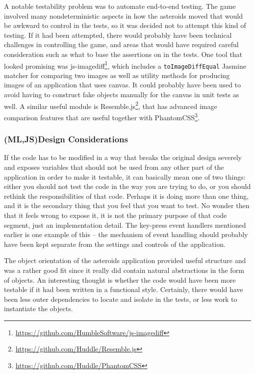 \documentclass[11pt]{article}
\begin{document}
A notable testability problem was to automate end-to-end testing. The game involved many nondeterministic aspects in how the asteroids moved that would be awkward to control in the tests, so it was decided not to attempt this kind of testing. If it had been attempted, there would probably have been technical challenges in controlling the game, and areas that would have required careful consideration such as what to base the assertions on in the tests. One tool that looked promising was js-imagediff\footnote{\url{https://github.com/HumbleSoftware/js-imagediff}}, which includes a \texttt{toImageDiffEqual} Jasmine matcher for comparing two images as well as utility methods for producing images of an application that uses canvas. It could probably have been used to avoid having to construct fake objects manually for the canvas in unit tests as well. A similar useful module is Resemble.js\footnote{\url{https://github.com/Huddle/Resemble.js}}, that has advanced image comparison features that are useful together with PhantomCSS\footnote{\url{https://github.com/Huddle/PhantomCSS}}.

\subsubsection{(ML,JS)Design Considerations}

If the code has to be modified in a way that breaks the original design severely and exposes variables that should not be used from any other part of the application in order to make it testable, it can basically mean one of two things: either you should not test the code in the way you are trying to do, or you should rethink the responsibilities of that code. Perhaps it is doing more than one thing, and it is the secondary thing that you feel that you want to test. No wonder then that it feels wrong to expose it, it is not the primary purpose of that code segment, just an implementation detail. The key-press event handlers mentioned earlier is one example of this -- the mechanism of event handling should probably have been kept separate from the settings and controls of the application.

The object orientation of the asteroids application provided useful structure and was a rather good fit since it really did contain natural abstractions in the form of objects. An interesting thought is whether the code would have been more testable if it had been written in a functional style. Certainly, there would have been less outer dependencies to locate and isolate in the tests, or less work to instantiate the objects. \cite[question~26]{Ahnve}
\end{document}
